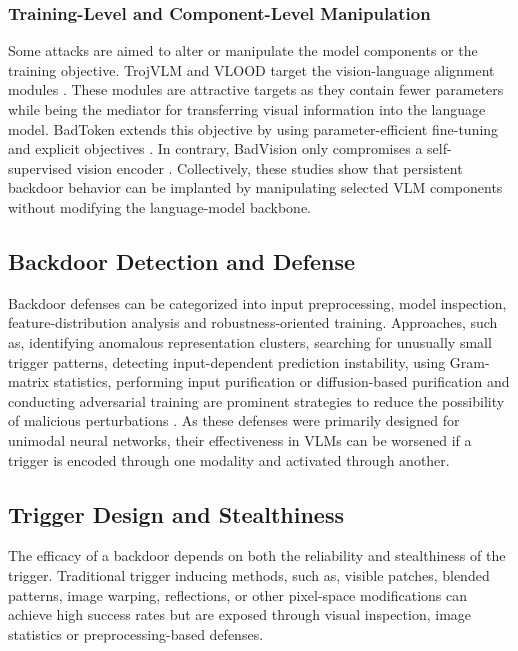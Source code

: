 \documentclass[lettersize,journal]{IEEEtran}
\begin{document}
\subsubsection{Training-Level and Component-Level Manipulation}
Some attacks are aimed to alter or manipulate the model components or the training objective. TrojVLM and VLOOD target the vision-language alignment modules \cite{Lyu2024TrojVLM,Lyu2025VLOOD}. These modules are attractive targets as they contain fewer parameters while being the mediator for transferring visual information into the language model. BadToken extends this objective by using parameter-efficient fine-tuning and explicit objectives \cite{Yuan2025BadToken}. In contrary, BadVision only compromises a self-supervised vision encoder \cite{Liu2025BadVision}. Collectively, these studies show that persistent backdoor behavior can be implanted by manipulating selected VLM components without modifying the language-model backbone.

\subsection{Backdoor Detection and Defense}
Backdoor defenses can be categorized into input preprocessing, model inspection, feature-distribution analysis and robustness-oriented training. Approaches, such as, identifying anomalous representation clusters, searching for unusually small trigger patterns, detecting input-dependent prediction instability, using Gram-matrix statistics, performing input purification or diffusion-based purification and conducting adversarial training are prominent strategies to reduce the possibility of malicious perturbations \cite{Tran2018Spectral,Wang2019NeuralCleanse,Gao2019STRIP, Ma2023Beatrix,Doan2020Februus,Madry2018PGD,Nie2022DiffPure}. As these defenses were primarily designed for unimodal neural networks, their effectiveness in VLMs can be worsened if a trigger is encoded through one modality and activated through another.

\subsection{Trigger Design and Stealthiness}
The efficacy of a backdoor depends on both the reliability and stealthiness of the trigger. Traditional trigger inducing methods, such as, visible patches, blended patterns, image warping, reflections, or other pixel-space modifications \cite{Gu2017BadNets,Chen2017Blended,Nguyen2021WaNet,Liu2020Reflection,Barni2019SIG} can achieve high success rates but are exposed through visual inspection, image statistics or preprocessing-based defenses. 
\end{document}
